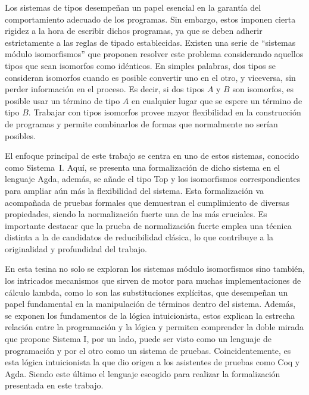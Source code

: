 Los sistemas de tipos desempeñan un papel esencial en la garantía del comportamiento adecuado de los programas.
Sin embargo, estos imponen cierta rigidez a la hora de escribir dichos programas, ya que se deben adherir estrictamente a las reglas de tipado establecidas.
Existen una serie de ``sistemas módulo isomorfismos'' que proponen resolver este problema considerando aquellos tipos que sean isomorfos como idénticos.
En simples palabras, dos tipos se consideran isomorfos cuando es posible convertir uno en el otro, y viceversa, sin perder información en el proceso.
Es decir, si dos tipos $A$ y $B$ son isomorfos, es posible usar un término de tipo $A$ en cualquier lugar que se espere un término de tipo $B$.
Trabajar con tipos isomorfos provee mayor flexibilidad en la construcción de programas y permite combinarlos de formas que normalmente no serían posibles.

El enfoque principal de este trabajo se centra en uno de estos sistemas, conocido como Sistema~I.
Aquí, se presenta una formalización de dicho sistema en el lenguaje Agda, además, se añade el tipo Top y los isomorfismos correspondientes para ampliar aún más la flexibilidad del sistema.
Esta formalización va acompañada de pruebas formales que demuestran el cumplimiento de diversas propiedades, siendo la normalización fuerte una de las más cruciales.
Es importante destacar que la prueba de normalización fuerte emplea una técnica distinta a la de candidatos de reducibilidad clásica, lo que contribuye a la originalidad y profundidad del trabajo.

En esta tesina no solo se exploran los sistemas módulo isomorfismos sino también, los intricados mecanismos que sirven de motor para muchas implementaciones de cálculo lambda, como lo son las substituciones explícitas, que desempeñan un papel fundamental en la manipulación de términos dentro del sistema.
Además, se exponen los fundamentos de la lógica intuicionista, estos explican la estrecha relación entre la programación y la lógica y permiten comprender la doble mirada que propone Sistema I, por un lado, puede ser visto como un lenguaje de programación y por el otro como un sistema de pruebas.
Coincidentemente, es esta lógica intuicionista la que dio origen a los asistentes de pruebas como Coq y Agda.
Siendo este último el lenguaje escogido para realizar la formalización presentada en este trabajo.